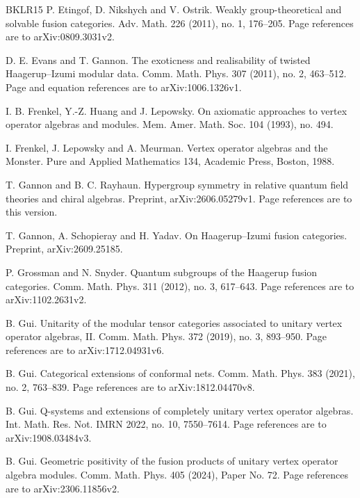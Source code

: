 \documentclass[leqno]{article}
\numberwithin{equation}{section}
\begin{document}
\begin{thebibliography}{BKLR15}
P. Etingof, D. Nikshych and V. Ostrik.
\newblock Weakly group-theoretical and solvable fusion categories.
\newblock Adv. Math. 226 (2011), no. 1, 176--205. Page references are to arXiv:0809.3031v2.

D. E. Evans and T. Gannon.
\newblock The exoticness and realisability of twisted Haagerup--Izumi modular data.
\newblock Comm. Math. Phys. 307 (2011), no. 2, 463--512. Page and equation references are to arXiv:1006.1326v1.

I. B. Frenkel, Y.-Z. Huang and J. Lepowsky.
\newblock On axiomatic approaches to vertex operator algebras and modules.
\newblock Mem. Amer. Math. Soc. 104 (1993), no. 494.

I. Frenkel, J. Lepowsky and A. Meurman.
\newblock Vertex operator algebras and the Monster.
\newblock Pure and Applied Mathematics 134, Academic Press, Boston, 1988.

T. Gannon and B. C. Rayhaun.
\newblock Hypergroup symmetry in relative quantum field theories and chiral algebras.
\newblock Preprint, arXiv:2606.05279v1. Page references are to this version.

T. Gannon, A. Schopieray and H. Yadav.
\newblock On Haagerup--Izumi fusion categories.
\newblock Preprint, arXiv:2609.25185.

P. Grossman and N. Snyder.
\newblock Quantum subgroups of the Haagerup fusion categories.
\newblock Comm. Math. Phys. 311 (2012), no. 3, 617--643. Page references are to arXiv:1102.2631v2.

B. Gui.
\newblock Unitarity of the modular tensor categories associated to unitary vertex operator algebras, II.
\newblock Comm. Math. Phys. 372 (2019), no. 3, 893--950. Page references are to arXiv:1712.04931v6.

B. Gui.
\newblock Categorical extensions of conformal nets.
\newblock Comm. Math. Phys. 383 (2021), no. 2, 763--839. Page references are to arXiv:1812.04470v8.

B. Gui.
\newblock Q-systems and extensions of completely unitary vertex operator algebras.
\newblock Int. Math. Res. Not. IMRN 2022, no. 10, 7550--7614. Page references are to arXiv:1908.03484v3.

B. Gui.
\newblock Geometric positivity of the fusion products of unitary vertex operator algebra modules.
\newblock Comm. Math. Phys. 405 (2024), Paper No. 72. Page references are to arXiv:2306.11856v2.


\end{thebibliography}
\end{document}
